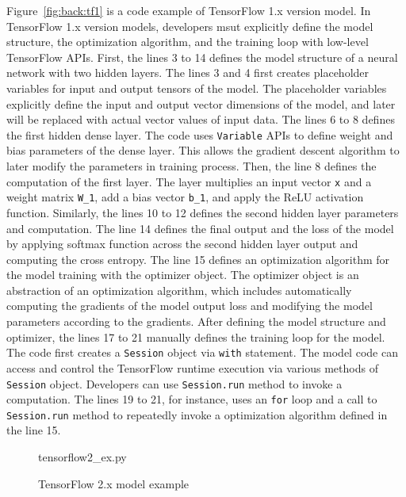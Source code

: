Figure~\ref{fig:back:tf1} is a code example of TensorFlow 1.x version model.
In TensorFlow 1.x version models, developers msut explicitly define
the model structure, the optimization algorithm, and the training loop 
with low-level TensorFlow APIs.
First, the lines 3 to 14 defines the model
structure of a neural network with two hidden layers.
The lines 3 and 4 first creates placeholder variables for input and output
tensors of the model. The placeholder variables explicitly define the
input and output vector dimensions of the model, and later will
be replaced with actual vector values of input data.
The lines 6 to 8 defines the first hidden dense layer.
The code uses {\tt Variable} APIs to define weight and bias parameters of
the dense layer. This allows the gradient descent algorithm to 
later modify the parameters in training process. 
Then, the line 8 defines the computation of the first layer.
The layer multiplies an input vector {\tt x} and a weight matrix
{\tt W\_1}, add a bias vector {\tt b\_1}, and apply the ReLU activation
function.
Similarly, the lines 10 to 12 defines the second hidden layer parameters
and computation.
The line 14 defines the final output and the loss of the model by
applying softmax function across the second hidden layer output and
computing the cross entropy. 
The line 15 defines an optimization algorithm for the model training with
the optimizer object.
The optimizer object is an abstraction of an optimization algorithm,
which includes automatically computing the gradients of the model output loss 
and modifying the model parameters according to the gradients.
After defining the model structure and optimizer, the lines 17 to 21
manually defines the training loop for the model.
The code first creates a {\tt Session} object via {\tt with} statement.
The model code can access and control the TensorFlow runtime execution
via various methods of {\tt Session} object.
Developers can use {\tt Session.run} method to invoke a computation.
The lines 19 to 21, for instance, uses an {\tt for} loop and
a call to {\tt Session.run} method to repeatedly invoke a
optimization algorithm defined in the line 15.

\begin{figure}[ht!]

{tensorflow2_ex.py}
  \caption{TensorFlow 2.x model example}
\label{fig:back:tf2}
\end{figure}

